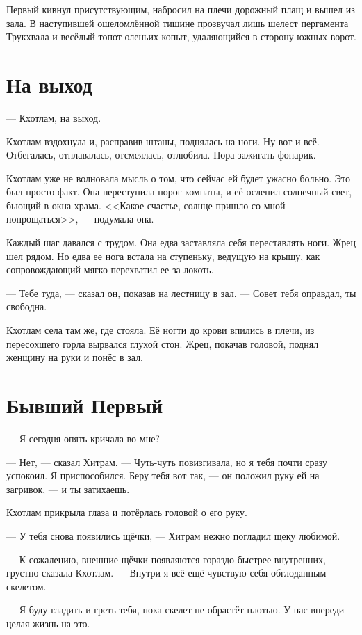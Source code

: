 \documentclass[a4paper,10pt,fleqn]{book}\usepackage{cooltooltips}\usepackage{polyglossia}\setdefaultlanguage{english}\setotherlanguage{russian}\defaultfontfeatures{Ligatures=TeX,Mapping=tex-text} \usepackage{xcolor}\definecolor{lightgray}{HTML}{bbbbbb}\color{lightgray}\newcommand{\ml}[3]{\textcolor{black}{#3}}
\begin{document}
Первый кивнул присутствующим, набросил на плечи дорожный плащ и вышел из зала.
В наступившей ошеломлённой тишине прозвучал лишь шелест пергамента Трукхвала и весёлый топот оленьих копыт, удаляющийся в сторону южных ворот.

\section{На выход}

--- Кхотлам, на выход.

Кхотлам вздохнула и, расправив штаны, поднялась на ноги.
Ну вот и всё.
Отбегалась, отплавалась, отсмеялась, отлюбила.
Пора зажигать фонарик.

Кхотлам уже не волновала мысль о том, что сейчас ей будет ужасно больно.
Это был просто факт.
Она переступила порог комнаты, и её ослепил солнечный свет, бьющий в окна храма.
<<Какое счастье, солнце пришло со мной попрощаться>>, --- подумала она.

Каждый шаг давался с трудом.
Она едва заставляла себя переставлять ноги.
Жрец шел рядом.
Но едва ее нога встала на ступеньку, ведущую на крышу, как сопровождающий мягко перехватил ее за локоть.

--- Тебе туда, --- сказал он, показав на лестницу в зал.
--- Совет тебя оправдал, ты свободна.

Кхотлам села там же, где стояла.
Её ногти до крови впились в плечи, из пересохшего горла вырвался глухой стон.
Жрец, покачав головой, поднял женщину на руки и понёс в зал.

\section{Бывший Первый}

--- Я сегодня опять кричала во мне?

--- Нет, --- сказал Хитрам.
--- Чуть-чуть повизгивала, но я тебя почти сразу успокоил.
Я приспособился.
Беру тебя вот так, --- он положил руку ей на загривок, --- и ты затихаешь.

Кхотлам прикрыла глаза и потёрлась головой о его руку.

--- У тебя снова появились щёчки, --- Хитрам нежно погладил щеку любимой.

--- К сожалению, внешние щёчки появляются гораздо быстрее внутренних, --- грустно сказала Кхотлам.
--- Внутри я всё ещё чувствую себя обглоданным скелетом.

--- Я буду гладить и греть тебя, пока скелет не обрастёт плотью.
У нас впереди целая жизнь на это.
\end{document}
